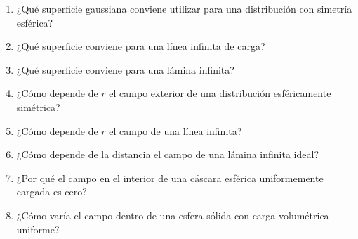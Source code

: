 \begin{enumerate}
    \item ¿Qué superficie gaussiana conviene utilizar para una distribución con simetría
    esférica?

    \item ¿Qué superficie conviene para una línea infinita de carga?

    \item ¿Qué superficie conviene para una lámina infinita?

    \item ¿Cómo depende de \(r\) el campo exterior de una distribución esféricamente
    simétrica?

    \item ¿Cómo depende de \(r\) el campo de una línea infinita?

    \item ¿Cómo depende de la distancia el campo de una lámina infinita ideal?

    \item ¿Por qué el campo en el interior de una cáscara esférica uniformemente cargada
    es cero?

    \item ¿Cómo varía el campo dentro de una esfera sólida con carga volumétrica uniforme?
\end{enumerate}


